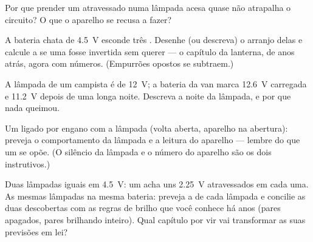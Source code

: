 \begin{exercise}[$\star$]\label{exo:g8:voltage-voltmeter:8}
Por que prender um  atravessado numa lâmpada acesa quase
não atrapalha o circuito? O que o aparelho se recusa a fazer?
\end{exercise}

\begin{exercise}[$\star\star$]\label{exo:g8:voltage-voltmeter:9}
A bateria chata de \qty{4.5}{V} esconde três . Desenhe (ou
descreva) o arranjo delas e calcule a  se uma  fosse
invertida sem querer --- o capítulo da lanterna, de anos atrás, agora
com números. (Empurrões opostos se subtraem.)
\end{exercise}

\begin{exercise}[$\star\star$]\label{exo:g8:voltage-voltmeter:10}
A lâmpada de um campista é de \qty{12}{V}; a bateria da van marca
\qty{12.6}{V} carregada e \qty{11.2}{V} depois de uma longa noite.
Descreva a noite da lâmpada, e por que nada queimou.
\end{exercise}

\begin{exercise}[$\star\star$]\label{exo:g8:voltage-voltmeter:11}
Um  ligado por engano \emph{} com a lâmpada (volta
aberta, aparelho na abertura): preveja o comportamento da lâmpada e a
leitura do aparelho --- lembre do que um  se opõe. (O
silêncio da lâmpada e o número do aparelho são os dois instrutivos.)
\end{exercise}

\begin{exercise}[$\star\star\star$]\label{exo:g8:voltage-voltmeter:12}
Duas lâmpadas iguais  em \qty{4.5}{V}: um  acha uns
\qty{2.25}{V} atravessados em cada uma. As mesmas lâmpadas  na mesma bateria: preveja a  de cada lâmpada e
concilie as duas descobertas com as regras de brilho que você conhece
há anos (pares  apagados, pares  brilhando
inteiro). Qual capítulo por vir vai transformar as suas previsões em
lei?
\end{exercise}


